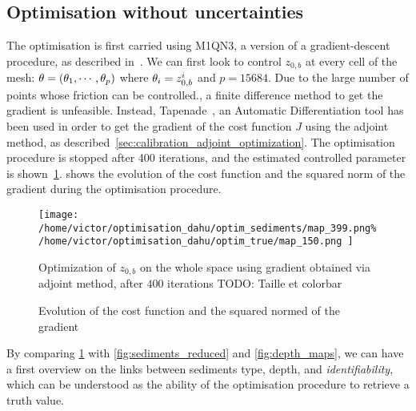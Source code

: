 \documentclass[../../Main_ManuscritThese.tex]{subfiles}
\newcommand{\zob}{z_{0,b}}
\begin{document}
\subsection{Optimisation without uncertainties}
The optimisation is first carried using M1QN3, a version of a
gradient-descent procedure, as described
in~\cite{gilbert_numerical_1989}. We can first look to control $\zob$
at every cell of the mesh: $\theta = (\theta_1,\cdots, \theta_p)$ where
$\kk_i = \zob^i$ and $p=\num{15684}$. Due to the large number of
points whose friction can be controlled., a finite difference method
to get the gradient is unfeasible. Instead,
Tapenade~\citep{hascoet_tapenade_2013}, an Automatic Differentiation
tool has been used in order to get the gradient of the cost function
$J$ using the adjoint method, as
described~\cref{sec:calibration_adjoint_optimization}. The
optimisation procedure is stopped after \num{400} iterations, and the
estimated controlled parameter is
shown~\cref{fig:optimization_map_399}.
 shows the
evolution of the cost function and the squared norm of the gradient
during the optimisation procedure.

 \begin{figure}[ht]
  \centering
  \texttt{[image: /home/victor/optimisation\_dahu/optim\_sediments/map\_399.png\% /home/victor/optimisation\_dahu/optim\_true/map\_150.png
  ]}
  \caption{\label{fig:optimization_map_399} Optimization of $\zob$ on the whole space using gradient obtained via adjoint method, after $400$ iterations TODO: {Taille et colorbar}}
\end{figure}

 \begin{figure}[ht]
  \centering
  
  \caption{\label{fig:ctrl_true} Evolution of the cost function and the squared normed of the gradient}
\end{figure}
By comparing \cref{fig:optimization_map_399} with
\cref{fig:sediments_reduced} and \cref{fig:depth_maps}, we can have a
first overview on the links between sediments type, depth, and
\emph{identifiability}, which can be understood as the ability of the
optimisation procedure to retrieve a truth value.
\end{document}
